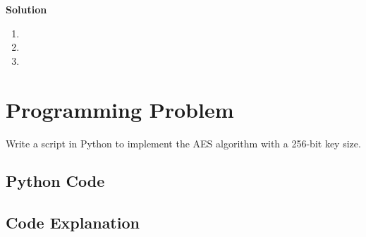 \documentclass[11pt]{article}
\begin{document}
\textbf{Solution}

\begin{enumerate}[label=(\alph*)]
\item
\item
\item
\end{enumerate}

\pagebreak


\section{Programming Problem}

Write a script in Python to implement the AES algorithm with a 256-bit key size. 

\subsection{Python Code}

\pagebreak

\subsection{Code Explanation}
\end{document}
